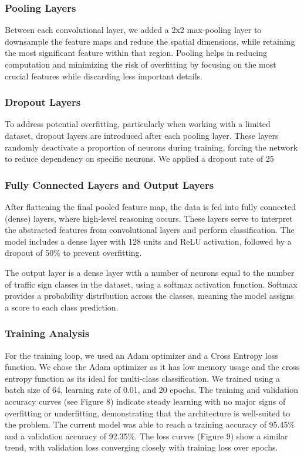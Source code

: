 \documentclass{article} %
\begin{document}
\subsubsection{Pooling Layers}
Between each convolutional layer, we added a 2x2 max-pooling layer to downsample the feature maps and reduce the spatial dimensions, while retaining the most significant feature within that region. Pooling helps in reducing computation and minimizing the risk of overfitting by focusing on the most crucial features while discarding less important details.

\subsubsection{Dropout Layers}
To address potential overfitting, particularly when working with a limited dataset, dropout layers are introduced after each pooling layer. These layers randomly deactivate a proportion of neurons during training, forcing the network to reduce dependency on specific neurons. We applied a dropout rate of 25%

\subsubsection{Fully Connected Layers and Output Layers}
After flattening the final pooled feature map, the data is fed into fully connected (dense) layers, where high-level reasoning occurs. These layers serve to interpret the abstracted features from convolutional layers and perform classification. The model includes a dense layer with 128 units and ReLU activation, followed by a dropout of 50\% to prevent overfitting.

The output layer is a dense layer with a number of neurons equal to the number of traffic sign classes in the dataset, using a softmax activation function. Softmax provides a probability distribution across the classes, meaning the model assigns a score to each class prediction.

\subsubsection{Training Analysis}
For the training loop, we used an Adam optimizer and a Cross Entropy loss function. We chose the Adam optimizer as it has low memory usage and the cross entropy function as its ideal for multi-class classification. We trained using a batch size of 64, learning rate of 0.01, and 20 epochs. The training and validation accuracy curves (see Figure 8) indicate steady learning with no major signs of overfitting or underfitting, demonstrating that the architecture is well-suited to the problem. The current model was able to reach a training accuracy of 95.45\% and a validation accuracy of 92.35\%. The loss curves (Figure 9) show a similar trend, with validation loss converging closely with training loss over epochs.
\end{document}
